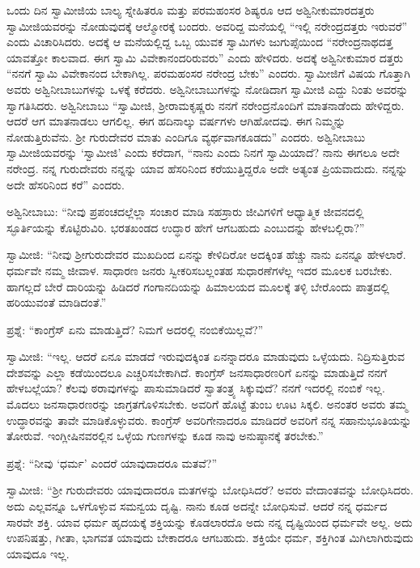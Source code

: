  ಒಂದು ದಿನ ಸ್ವಾಮೀಜಿಯ ಬಾಲ್ಯ ಸ್ನೇಹಿತರೂ ಮತ್ತು ಪರಮಹಂಸರ ಶಿಷ್ಯರೂ ಆದ ಅಶ್ವಿನೀಕುಮಾರದತ್ತರು ಸ್ವಾಮೀಜಿಯವರನ್ನು ನೋಡುವುದಕ್ಕೆ ಆಲ್ಮೋರಕ್ಕೆ ಬಂದರು. ಅವರಿದ್ದ ಮನೆಯಲ್ಲಿ “ಇಲ್ಲಿ ನರೇಂದ್ರದತ್ತರು ಇರುವರೆ” ಎಂದು ವಿಚಾರಿಸಿದರು. ಅದಕ್ಕೆ ಆ ಮನೆಯಲ್ಲಿದ್ದ ಒಬ್ಬ ಯುವಕ ಸ್ವಾಮಿಗಳು ಜುಗುಪ್ಸೆಯಿಂದ “ನರೇಂದ್ರನಾಥದತ್ತ ಯಾವತ್ತೋ ಕಾಲವಾದ. ಈಗ ಸ್ವಾಮಿ ವಿವೇಕಾನಂದರಿರುವರು” ಎಂದು ಹೇಳಿದರು. ಅದಕ್ಕೆ ಅಶ್ವಿನೀಕುಮಾರ ದತ್ತರು “ನನಗೆ ಸ್ವಾಮಿ ವಿವೇಕಾನಂದ ಬೇಕಾಗಿಲ್ಲ. ಪರಮಹಂಸರ ನರೇಂದ್ರ ಬೇಕು” ಎಂದರು. ಸ್ವಾಮೀಜಿಗೆ ವಿಷಯ ಗೊತ್ತಾಗಿ ಅವರು ಅಶ್ವಿನೀಬಾಬುಗಳನ್ನು ಒಳಕ್ಕೆ ಕರೆದರು. ಅಶ್ವಿನೀಬಾಬುಗಳನ್ನು ನೋಡಿದಾಗ ಸ್ವಾಮೀಜಿ ಎದ್ದು ನಿಂತು ಅವರನ್ನು ಸ್ವಾಗತಿಸಿದರು. ಅಶ್ವಿನೀಬಾಬು “ಸ್ವಾಮೀಜಿ, ಶ‍್ರೀರಾಮಕೃಷ್ಣರು ನನಗೆ ನರೇಂದ್ರನೊಂದಿಗೆ ಮಾತನಾಡೆಂದು ಹೇಳಿದ್ದರು. ಆದರೆ ಆಗ ಮಾತನಾಡಲು ಆಗಲಿಲ್ಲ. ಈಗ ಹದಿನಾಲ್ಕು ವರ್ಷಗಳು ಆಗಿಹೋದವು. ಈಗ ನಿಮ್ಮನ್ನು ನೋಡುತ್ತಿರುವೆನು. ಶ‍್ರೀ ಗುರುದೇವರ ಮಾತು ಎಂದಿಗೂ ವ್ಯರ್ಥವಾಗಕೂಡದು” ಎಂದರು. ಅಶ್ವಿನೀಬಾಬು ಸ್ವಾಮೀಜಿಯವರನ್ನು ‘ಸ್ವಾಮೀಜಿ’ ಎಂದು ಕರೆದಾಗ, “ನಾನು ಎಂದು ನಿನಗೆ ಸ್ವಾಮಿಯಾದೆ? ನಾನು ಈಗಲೂ ಅದೇ ನರೇಂದ್ರ. ನನ್ನ ಗುರುದೇವರು ನನ್ನನ್ನು ಯಾವ ಹೆಸರಿನಿಂದ ಕರೆಯುತ್ತಿದ್ದರೊ ಅದೇ ಅತ್ಯಂತ ಪ್ರಿಯವಾದುದು. ನನ್ನನ್ನು ಅದೇ ಹೆಸರಿನಿಂದ ಕರೆ” ಎಂದರು. 

 ಅಶ್ವಿನೀಬಾಬು: “ನೀವು ಪ್ರಪಂಚದಲ್ಲೆಲ್ಲಾ ಸಂಚಾರ ಮಾಡಿ ಸಹಸ್ರಾರು ಜೀವಿಗಳಿಗೆ ಆಧ್ಯಾತ್ಮಿಕ ಜೀವನದಲ್ಲಿ ಸ್ಫೂರ್ತಿಯನ್ನು ಕೊಟ್ಟಿರುವಿರಿ. ಭರತಖಂಡದ ಉದ್ಧಾರ ಹೇಗೆ ಆಗಬಹುದು ಎಂಬುದನ್ನು ಹೇಳಬಲ್ಲಿರಾ?” 

 ಸ್ವಾಮೀಜಿ: “ನೀವು ಶ‍್ರೀಗುರುದೇವರ ಮುಖದಿಂದ ಏನನ್ನು ಕೇಳಿದಿರೋ ಅದಕ್ಕಿಂತ ಹೆಚ್ಚು ನಾನು ಏನನ್ನೂ ಹೇಳಲಾರೆ. ಧರ್ಮವೇ ನಮ್ಮ ಜೀವಾಳ. ಸಾಧಾರಣ ಜನರು ಸ್ವೀಕರಿಸಬಲ್ಲಂತಹ ಸುಧಾರಣೆಗಳೆಲ್ಲ ಇದರ ಮೂಲಕ ಬರಬೇಕು. ಹಾಗಲ್ಲದೆ ಬೇರೆ ದಾರಿಯನ್ನು ಹಿಡಿದರೆ ಗಂಗಾನದಿಯನ್ನು ಹಿಮಾಲಯದ ಮೂಲಕ್ಕೆ ತಳ್ಳಿ ಬೇರೊಂದು ಪಾತ್ರದಲ್ಲಿ ಹರಿಯುವಂತೆ ಮಾಡಿದಂತೆ.” 

 ಪ್ರಶ್ನೆ: “ಕಾಂಗ್ರೆಸ್ ಏನು ಮಾಡುತ್ತಿದೆ? ನಿಮಗೆ ಅದರಲ್ಲಿ ನಂಬಿಕೆಯಿಲ್ಲವೆ?” 

 ಸ್ವಾಮೀಜಿ: “ಇಲ್ಲ. ಆದರೆ ಏನೂ ಮಾಡದೆ ಇರುವುದಕ್ಕಿಂತ ಏನನ್ನಾದರೂ‌ ಮಾಡುವುದು ಒಳ್ಳೆಯದು. ನಿದ್ರಿಸುತ್ತಿರುವ ದೇಶವನ್ನು ಎಲ್ಲಾ ಕಡೆಯಿಂದಲೂ ಎಚ್ಚರಿಸಬೇಕಾಗಿದೆ. ಕಾಂಗ್ರೆಸ್ ಜನಸಾಧಾರಣರಿಗೆ ಏನನ್ನು ಮಾಡುತ್ತಿದೆ ನನಗೆ ಹೇಳಬಲ್ಲೆಯಾ? ಕೆಲವು ಠರಾವುಗಳನ್ನು ಪಾಸುಮಾಡಿದರೆ ಸ್ವಾತಂತ್ರ್ಯ ಸಿಕ್ಕುವುದೆ? ನನಗೆ ಇದರಲ್ಲಿ ನಂಬಿಕೆ ಇಲ್ಲ. ಮೊದಲು ಜನಸಾಧಾರಣರನ್ನು ಜಾಗ್ರತಗೊಳಿಸಬೇಕು. ಅವರಿಗೆ ಹೊಟ್ಟೆ ತುಂಬ ಊಟ ಸಿಕ್ಕಲಿ. ಅನಂತರ ಅವರು ತಮ್ಮ ಉದ್ಧಾರವನ್ನು ತಾವೇ ಮಾಡಿಕೊಳ್ಳುವರು. ಕಾಂಗ್ರೆಸ್ ಅವರಿಗೇನಾದರೂ ಮಾಡಿದರೆ ಅವರಿಗೆ ನನ್ನ ಸಹಾನುಭೂತಿಯನ್ನು ತೋರುವೆ. ಇಂಗ್ಲೀಷಿನವರಲ್ಲಿನ ಒಳ್ಳೆಯ ಗುಣಗಳನ್ನು ಕೂಡ ನಾವು ಅನುಷ್ಠಾನಕ್ಕೆ ತರಬೇಕು.” 

 ಪ್ರಶ್ನೆ: “ನೀವು ‘ಧರ್ಮ’ ಎಂದರೆ ಯಾವುದಾದರೂ ಮತವೆ?” 

 ಸ್ವಾಮೀಜಿ: “ಶ‍್ರೀ ಗುರುದೇವರು ಯಾವುದಾದರೂ ಮತಗಳನ್ನು ಬೋಧಿಸಿದರೆ? ಅವರು ವೇದಾಂತವನ್ನು ಬೋಧಿಸಿದರು. ಅದು ಎಲ್ಲವನ್ನೂ ಒಳಗೊಳ್ಳುವ ಸಮನ್ವಯ ದೃಷ್ಟಿ. ನಾನು ಕೂಡ ಅದನ್ನೇ ಬೋಧಿಸುವೆ. ಆದರೆ ನನ್ನ ಧರ್ಮದ ಸಾರವೇ ಶಕ್ತಿ. ಯಾವ ಧರ್ಮ ಹೃದಯಕ್ಕೆ ಶಕ್ತಿಯನ್ನು ಕೊಡಲಾರದೊ ಅದು ನನ್ನ ದೃಷ್ಟಿಯಿಂದ ಧರ್ಮವೇ ಅಲ್ಲ. ಅದು ಉಪನಿಷತ್ತು, ಗೀತಾ, ಭಾಗವತ ಯಾವುದು ಬೇಕಾದರೂ ಆಗಬಹುದು. ಶಕ್ತಿಯೇ ಧರ್ಮ, ಶಕ್ತಿಗಿಂತ ಮಿಗಿಲಾಗಿರುವುದು ಯಾವುದೂ ಇಲ್ಲ. 

